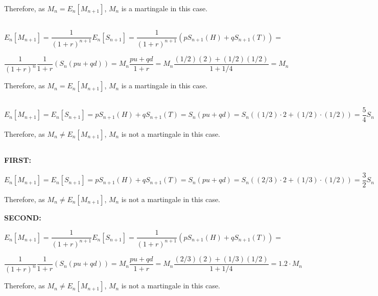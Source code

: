 \documentclass[paper=a4, fontsize=11pt]{scrartcl} %
\numberwithin{equation}{section} %
\numberwithin{figure}{section} %
\numberwithin{table}{section} %
\begin{document}
Therefore, as $ M_{n} = E_{n}[M_{n+1}] $, $M_{n}$ is a martingale in this case.



\subsection{}

$$ E_{n}[M_{n+1}] = \frac{1}{(1+r)^{n+1}}E_{n}[S_{n+1}] = \frac{1}{(1+r)^{n+1}}(pS_{n+1}(H) + qS_{n+1}(T)) =  $$

$$ \frac{1}{(1+r)^{n}}\frac{1}{1+r}(S_{n}(pu + qd)) = M_{n}\frac{pu+qd}{1+r} = M_{n}\frac{(1/2)(2)+(1/2)(1/2)}{1+1/4} = M_{n} $$

Therefore, as $ M_{n} = E_{n}[M_{n+1}] $, $M_{n}$ is a martingale in this case.

\subsection{}

$$ E_{n}[M_{n+1}] = E_{n}[S_{n+1}] = pS_{n+1}(H) + qS_{n+1}(T) = S_{n}(pu + qd) = S_{n}((1/2)\cdot 2 + (1/2)\cdot (1/2)) = \frac{5}{4}S_{n} $$

Therefore, as $ M_{n} \neq E_{n}[M_{n+1}] $, $M_{n}$ is not a martingale in this case.



\subsection{}

\textbf{FIRST:}

$$ E_{n}[M_{n+1}] = E_{n}[S_{n+1}] = pS_{n+1}(H) + qS_{n+1}(T) = S_{n}(pu + qd) = S_{n}((2/3)\cdot 2 + (1/3)\cdot (1/2)) = \frac{3}{2}S_{n} $$

Therefore, as $ M_{n} \neq E_{n}[M_{n+1}] $, $M_{n}$ is not a martingale in this case.


\textbf{SECOND:}

$$ E_{n}[M_{n+1}] = \frac{1}{(1+r)^{n+1}}E_{n}[S_{n+1}] = \frac{1}{(1+r)^{n+1}}(pS_{n+1}(H) + qS_{n+1}(T)) =  $$

$$ \frac{1}{(1+r)^{n}}\frac{1}{1+r}(S_{n}(pu + qd)) = M_{n}\frac{pu+qd}{1+r} = M_{n}\frac{(2/3)(2)+(1/3)(1/2)}{1+1/4} = 1.2 \cdot M_{n} $$

Therefore, as $ M_{n} \neq E_{n}[M_{n+1}] $, $M_{n}$ is not a martingale in this case.




\subsection{}
\end{document}

